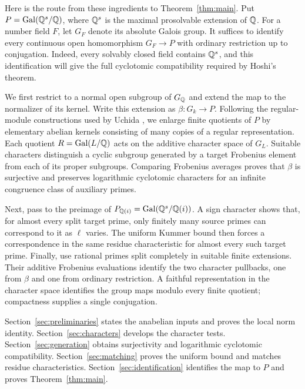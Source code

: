 Here is the route from these ingredients to Theorem~\ref{thm:main}. Put $P=\operatorname{Gal}(\mathbb Q^s/\mathbb Q)$, where $\mathbb Q^s$ is the maximal prosolvable extension of $\mathbb Q$. For a number field $F$, let $G_F$ denote its absolute Galois group. It suffices to identify every continuous open homomorphism $G_F\to P$ with ordinary restriction up to conjugation. Indeed, every solvably closed field contains $\mathbb Q^s$, and this identification will give the full cyclotomic compatibility required by Hoshi's theorem.

We first restrict to a normal open subgroup of $G_{\mathbb Q}$ and extend the map to the normalizer of its kernel. Write this extension as $\beta:G_k\to P$. Following the regular-module constructions used by Uchida \cite{uchida1979}, we enlarge finite quotients of $P$ by elementary abelian kernels consisting of many copies of a regular representation. Each quotient $R=\operatorname{Gal}(L/\mathbb Q)$ acts on the additive character space of $G_L$. Suitable characters distinguish a cyclic subgroup generated by a target Frobenius element from each of its proper subgroups. Comparing Frobenius averages proves that $\beta$ is surjective and preserves logarithmic cyclotomic characters for an infinite congruence class of auxiliary primes.

Next, pass to the preimage of $P_{\mathbb Q(i)}=\operatorname{Gal}(\mathbb Q^s/\mathbb Q(i))$. A sign character shows that, for almost every split target prime, only finitely many source primes can correspond to it as $\ell$ varies. The uniform Kummer bound then forces a correspondence in the same residue characteristic for almost every such target prime. Finally, use rational primes split completely in suitable finite extensions. Their additive Frobenius evaluations identify the two character pullbacks, one from $\beta$ and one from ordinary restriction. A faithful representation in the character space identifies the group maps modulo every finite quotient; compactness supplies a single conjugation.

Section~\ref{sec:preliminaries} states the anabelian inputs and proves the local norm identity. Section~\ref{sec:characters} develops the character tests. Section~\ref{sec:generation} obtains surjectivity and logarithmic cyclotomic compatibility. Section~\ref{sec:matching} proves the uniform bound and matches residue characteristics. Section~\ref{sec:identification} identifies the map to $P$ and proves Theorem~\ref{thm:main}.
